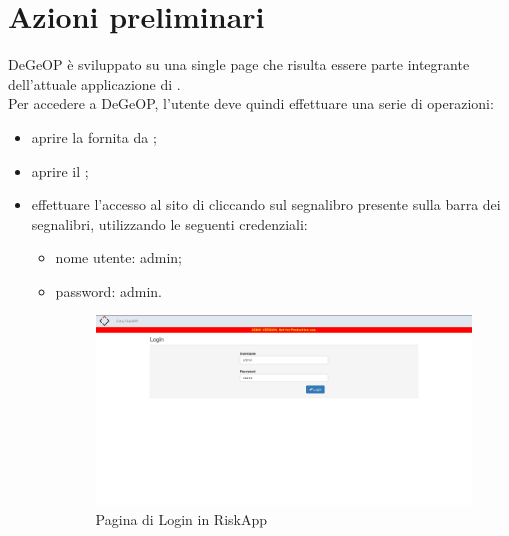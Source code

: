 \section{Azioni preliminari}
DeGeOP è sviluppato su una single page che risulta essere parte integrante dell'attuale applicazione di \riskapp{}.
\\
Per accedere a DeGeOP, l'utente deve quindi effettuare una serie di operazioni:
\begin{itemize}
	\item aprire la  fornita da \riskapp{};
	\item aprire il ;
	\item effettuare l'accesso al sito di \riskapp{} cliccando sul segnalibro presente sulla barra dei segnalibri, utilizzando le seguenti credenziali:
	\begin{itemize}
		\item nome utente: admin;
		\item password: admin.
		\begin{figure}[H]
		\centering
		\includegraphics[width=\textwidth]{img/accessoDeGeOP/s1-login.png}
		\caption{Pagina di Login in RiskApp}
		\end{figure}
		

\end{itemize}
\end{itemize}
